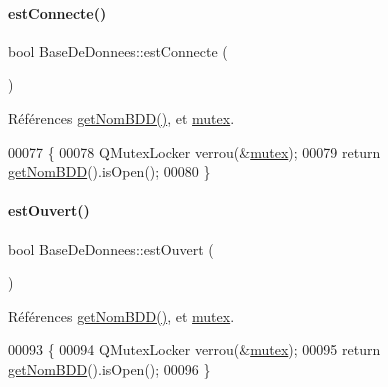 \paragraph{\texorpdfstring{est\+Connecte()}{estConnecte()}}
{\footnotesize\ttfamily bool Base\+De\+Donnees\+::est\+Connecte (\begin{DoxyParamCaption}{ }\end{DoxyParamCaption})}



Références \hyperlink{class_base_de_donnees_a467909531ae3cdebaf173f6e97cdc624}{get\+Nom\+B\+D\+D()}, et \hyperlink{class_base_de_donnees_aa1b4696fac87a740f914aa73739086f2}{mutex}.


\begin{DoxyCode}
00077 \{
00078     QMutexLocker verrou(&\hyperlink{class_base_de_donnees_aa1b4696fac87a740f914aa73739086f2}{mutex});
00079     \textcolor{keywordflow}{return} \hyperlink{class_base_de_donnees_a467909531ae3cdebaf173f6e97cdc624}{getNomBDD}().isOpen();
00080 \}
\end{DoxyCode}
\mbox{\label{class_base_de_donnees_af9ac332082ffd0dd35e412cefabe5e9c}} 
\paragraph{\texorpdfstring{est\+Ouvert()}{estOuvert()}}
{\footnotesize\ttfamily bool Base\+De\+Donnees\+::est\+Ouvert (\begin{DoxyParamCaption}{ }\end{DoxyParamCaption})}



Références \hyperlink{class_base_de_donnees_a467909531ae3cdebaf173f6e97cdc624}{get\+Nom\+B\+D\+D()}, et \hyperlink{class_base_de_donnees_aa1b4696fac87a740f914aa73739086f2}{mutex}.


\begin{DoxyCode}
00093 \{
00094     QMutexLocker verrou(&\hyperlink{class_base_de_donnees_aa1b4696fac87a740f914aa73739086f2}{mutex});
00095     \textcolor{keywordflow}{return} \hyperlink{class_base_de_donnees_a467909531ae3cdebaf173f6e97cdc624}{getNomBDD}().isOpen();
00096 \}
\end{DoxyCode}
\mbox{\label{class_base_de_donnees_aa8de5f8f8bb17edc43f5c0ee33712081}} 
